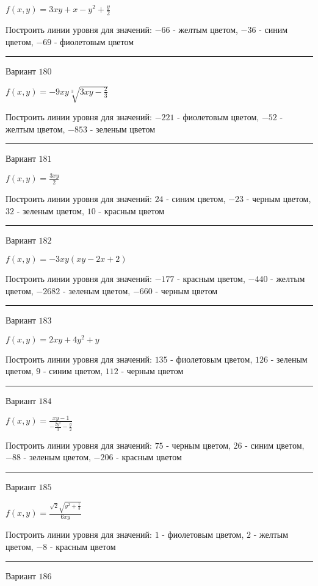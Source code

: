 \documentclass[11pt]{report}
\begin{document}
$f(x, y) = 3 x y + x - y^{2} + \frac{y}{2}$

Построить линии уровня для значений: $-66$ - желтым цветом, $-36$ - синим цветом, $-69$ - фиолетовым цветом
\begin{center}
\noindent\rule{8cm}{0.4pt}
\end{center}
Вариант $180$


$f(x, y) = - 9 x y \sqrt[3]{3 x y - \frac{2}{3}}$

Построить линии уровня для значений: $-221$ - фиолетовым цветом, $-52$ - желтым цветом, $-853$ - зеленым цветом
\begin{center}
\noindent\rule{8cm}{0.4pt}
\end{center}
Вариант $181$


$f(x, y) = \frac{3 x y}{2}$

Построить линии уровня для значений: $24$ - синим цветом, $-23$ - черным цветом, $32$ - зеленым цветом, $10$ - красным цветом
\begin{center}
\noindent\rule{8cm}{0.4pt}
\end{center}
Вариант $182$


$f(x, y) = - 3 x y \left(x y - 2 x + 2\right)$

Построить линии уровня для значений: $-177$ - красным цветом, $-440$ - желтым цветом, $-2682$ - зеленым цветом, $-660$ - черным цветом
\begin{center}
\noindent\rule{8cm}{0.4pt}
\end{center}
Вариант $183$


$f(x, y) = 2 x y + 4 y^{2} + y$

Построить линии уровня для значений: $135$ - фиолетовым цветом, $126$ - зеленым цветом, $9$ - синим цветом, $112$ - черным цветом
\begin{center}
\noindent\rule{8cm}{0.4pt}
\end{center}
Вариант $184$


$f(x, y) = \frac{x y - 1}{- \frac{2 y^{2}}{3} - \frac{y}{2}}$

Построить линии уровня для значений: $75$ - черным цветом, $26$ - синим цветом, $-88$ - зеленым цветом, $-206$ - красным цветом
\begin{center}
\noindent\rule{8cm}{0.4pt}
\end{center}
Вариант $185$


$f(x, y) = \frac{\sqrt{2} \sqrt{y^{2} + \frac{1}{3}}}{6 x y}$

Построить линии уровня для значений: $1$ - фиолетовым цветом, $2$ - желтым цветом, $-8$ - красным цветом
\begin{center}
\noindent\rule{8cm}{0.4pt}
\end{center}
Вариант $186$
\end{document}
